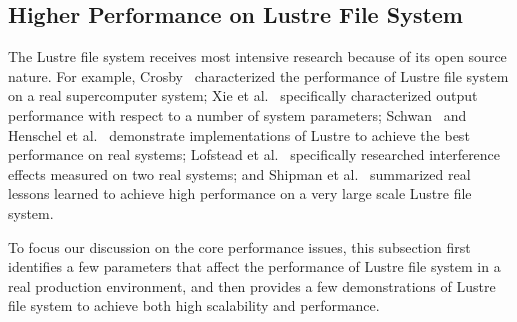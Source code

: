 \subsection{Higher Performance on Lustre File System}
%
The Lustre file system receives most intensive research because of its
open source nature. 
%
For example, Crosby~\cite{Crosby2009} characterized the performance of 
Lustre file system on a real supercomputer system;
%
Xie et al.~\cite{Xie2012} specifically characterized output performance
with respect to a number of system parameters;
%
Schwan~\cite{Schwan2003} and Henschel et al.~\cite{Henschel2012} 
demonstrate implementations of Lustre to achieve the best performance
on real systems; 
%
Lofstead et al.~\cite{lofstead2010managing} specifically researched 
interference effects measured on two real systems; and
%
Shipman et al.~\cite{Shipman2010} summarized real lessons learned 
to achieve high performance on a very large scale Lustre file system.

To focus our discussion on the core performance issues, 
this subsection first identifies a few parameters that affect the performance
of Lustre file system in a real production environment, and then provides
a few demonstrations of Lustre file system to achieve both high scalability
and performance. 


